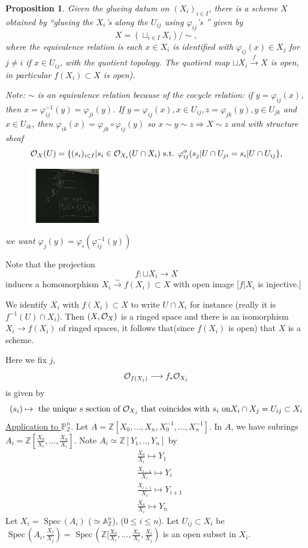 \documentclass[11pt]{article}
\newtheorem{prop}[thm]{Proposition}
\newcommand{\spec}{\text{ Spec}\,}
\newcommand{\affn}{\mathbb A}
\newcommand{\proj}{\mathbb P}
\newcommand{\intg}{\mathbb Z}
\newcommand{\calo}{{\cal O}}
\newcommand{\Lrta}{\Longrightarrow}
\newcommand{\lrta}{\longrightarrow}
\begin{document}
\begin{prop}
Given the glueing datum on $(X_i)_{i\in I}$, there is a scheme $X$ obtained by ``glueing the $X_i$'s along the $U_{ij}$ using $\varphi_{ij}$'s '' given by 
$$
X=\left(\sqcup_{i\in I}X_i\right)/\sim,
$$
where the equivalence relation is each $x\in X_i$ is identified with $\varphi_{ij}(x)\in X_{j}$ for $j\neq i$ if $x\in U_{ij}$, with the quotient topology. The quotient map $\sqcup X_i\overset{f}{\lrta} X$ is open, in particular $f(X_i)\subset X$ is open).

Note: $\sim$ is an equivalence relation because of the cocycle relation: if $y=\varphi_{ij}(x)$, then $x=\varphi_{ij}^{-1}(y)=\varphi_{ji}(y)$. If $y=\varphi_{ij}(x),x\in U_{ij},z=\varphi_{jk}(y), y\in U_{jk}$ and $x\in U_{ik}$, then $\varphi_{ik}(x)=\varphi_{jk}\circ \varphi_{ij}(y)$ so $x\sim y\sim z\Lrta X\sim z$ and with structure sheaf
$$
\calo_X(U)=\{(s_i)_{i\in I}|s_i\in \calo_{X_i}(U\cap X_i) \text{ s.t. } \varphi_{ij}^{\alpha}(s_{j}|U\cap U_{ji}=s_i|U\cap U_{ij}\},
$$
\begin{figure}[h]
\includegraphics[width=0.3\textwidth]{pic2Aprl27.pdf}
\end{figure}
we want
$\varphi_j(y)=\varphi_i(\varphi_{ij}^{-1}(y))$
\end{prop}
Note that the projection 
$$
f:\sqcup X_i\lrta X
$$ induces a homomorphism
$X_i\overset{\sim}{\lrta} f(X_i)\subset X$ with open image [$f|X_i$ is injective.]

We identify $X_i$ with $f(X_i)\subset X$ to write $U\cap X_i$ for instance (really it is $f^{-1}(U)\cap X_i$). Then $(X,\calo_X)$ is a ringed space  and there is an isomorphism 
$X_i\lrta f(X_i)$ of ringed spaces, it follows that(since $f(X_i)$ is open) that $X$ is a scheme.

Here we fix $j$,
$$
\calo_{f(X_j)}\lrta f_*\calo_{X_j}
$$
is given by 
$$
(s_i)\mapsto \text{ the unique $s$ section of $\calo_{X_j}$ that coincides with $s_i$ on} X_i\cap X_j=U_{ij}\subset X_i
$$
\underline{Application to } $\proj^n_\intg$. Let $A=\intg[X_0,...,X_n, X_0^{-1},...,X_n^{-1}]$. In $A$, we have subrings $A_i=\intg[\frac{X_0}{X_i},...,\frac{X_n}{X_i}]$. Note $A_i\simeq \intg[Y_1,..,Y_n]$ by 
$$
\begin{aligned}
&\frac{X_0}{X_i}\mapsto Y_1\\
&\frac{X_{i-1}}{X_i}\mapsto Y_{i}\\
&\frac{X_{i+1}}{X_i}\mapsto Y_{i+1}\\
&\frac{X_n}{X_i}\mapsto Y_n
\end{aligned}
$$
Let $X_i=\spec(A_i)$ ($\simeq \affn^n_\intg$), ($0\leq i \leq n$). Let $U_{ij}\subset X_i$ be $\spec(A_i,\frac{X_j}{X_j})=\spec (\intg[\frac{X_0}{X_i},...,\frac{X_n}{X_i},\frac{X_i}{X_j})$ is an open subset in $X_i$.
\end{document}
